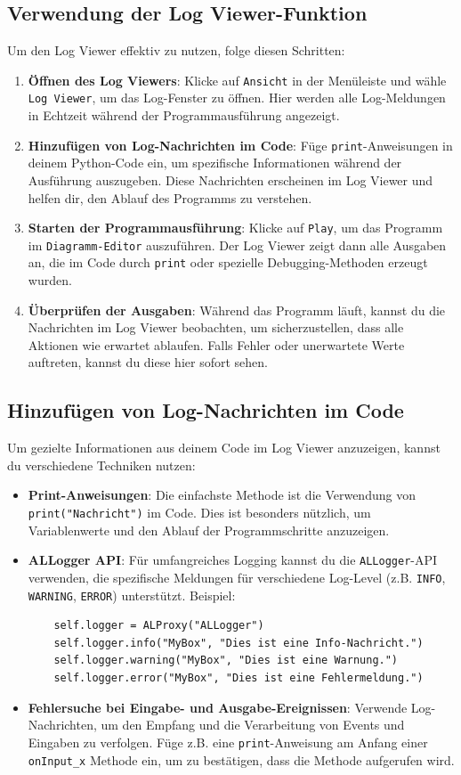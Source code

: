 \subsection{Verwendung der Log Viewer-Funktion}
Um den Log Viewer effektiv zu nutzen, folge diesen Schritten:
\begin{enumerate}
    \item \textbf{Öffnen des Log Viewers}: Klicke auf \texttt{Ansicht} in der Menüleiste und wähle \texttt{Log Viewer}, um das Log-Fenster zu öffnen. Hier werden alle Log-Meldungen in Echtzeit während der Programmausführung angezeigt.
    \item \textbf{Hinzufügen von Log-Nachrichten im Code}: Füge \texttt{print}-Anweisungen in deinem Python-Code ein, um spezifische Informationen während der Ausführung auszugeben. Diese Nachrichten erscheinen im Log Viewer und helfen dir, den Ablauf des Programms zu verstehen.
    \item \textbf{Starten der Programmausführung}: Klicke auf \texttt{Play}, um das Programm im \texttt{Diagramm-Editor} auszuführen. Der Log Viewer zeigt dann alle Ausgaben an, die im Code durch \texttt{print} oder spezielle Debugging-Methoden erzeugt wurden.
    \item \textbf{Überprüfen der Ausgaben}: Während das Programm läuft, kannst du die Nachrichten im Log Viewer beobachten, um sicherzustellen, dass alle Aktionen wie erwartet ablaufen. Falls Fehler oder unerwartete Werte auftreten, kannst du diese hier sofort sehen.
\end{enumerate}

\subsection{Hinzufügen von Log-Nachrichten im Code}
Um gezielte Informationen aus deinem Code im Log Viewer anzuzeigen, kannst du verschiedene Techniken nutzen:
\begin{itemize}
    \item \textbf{Print-Anweisungen}: Die einfachste Methode ist die Verwendung von \texttt{print("Nachricht")} im Code. Dies ist besonders nützlich, um Variablenwerte und den Ablauf der Programmschritte anzuzeigen.
    \item \textbf{ALLogger API}: Für umfangreiches Logging kannst du die \texttt{ALLogger}-API verwenden, die spezifische Meldungen für verschiedene Log-Level (z.B. \texttt{INFO}, \texttt{WARNING}, \texttt{ERROR}) unterstützt. Beispiel:
    \begin{verbatim}
    self.logger = ALProxy("ALLogger")
    self.logger.info("MyBox", "Dies ist eine Info-Nachricht.")
    self.logger.warning("MyBox", "Dies ist eine Warnung.")
    self.logger.error("MyBox", "Dies ist eine Fehlermeldung.")
    \end{verbatim}
    \item \textbf{Fehlersuche bei Eingabe- und Ausgabe-Ereignissen}: Verwende Log-Nachrichten, um den Empfang und die Verarbeitung von Events und Eingaben zu verfolgen. Füge z.B. eine \texttt{print}-Anweisung am Anfang einer \texttt{onInput\_x} Methode ein, um zu bestätigen, dass die Methode aufgerufen wird.
\end{itemize}

